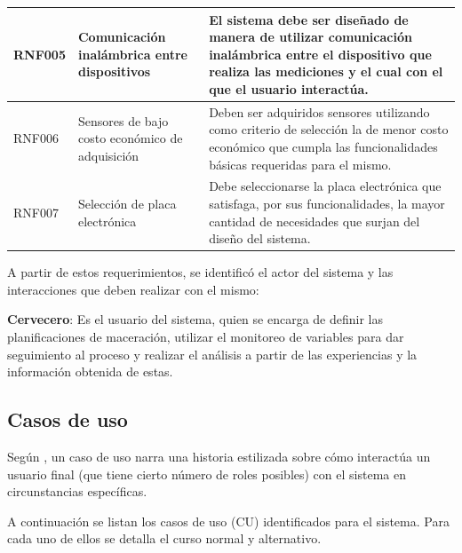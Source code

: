 \begin{longtable}{|p{1.4cm}|p{3.1cm}|p{9.5cm}|}
    RNF005 & Comunicación inalámbrica entre dispositivos & El sistema debe ser diseñado de manera de utilizar comunicación inalámbrica entre el dispositivo que realiza las mediciones y el cual con el que el usuario interactúa.
    \\ \hline
    
    RNF006 & Sensores de bajo costo económico de adquisición & Deben ser adquiridos sensores utilizando como criterio de selección la de menor costo económico que cumpla las funcionalidades básicas requeridas para el mismo.
    \\ \hline
    
    RNF007 & Selección de placa electrónica & Debe seleccionarse la placa electrónica que satisfaga, por sus funcionalidades, la mayor cantidad de necesidades que surjan del diseño del sistema.
    \\ \hline
 \end{longtable}
 
    \par
    A partir de estos requerimientos, se identificó el actor del sistema y las
    interacciones que deben realizar con el mismo:
    \par
    \textbf{Cervecero}: Es el usuario del sistema, quien se encarga de definir las planificaciones de maceración, utilizar el monitoreo de variables para dar seguimiento al proceso y realizar el análisis a partir de las experiencias y la información obtenida de estas.
 
    
    \subsection{Casos de uso}
    Según \cite{Press10}, un caso de uso narra una historia estilizada sobre cómo interactúa un usuario final (que tiene cierto número de roles posibles) con el sistema en circunstancias específicas.
    \par
    A continuación se listan los casos de uso (CU) identificados para el sistema. Para cada uno de ellos se detalla el curso normal y alternativo.
    
